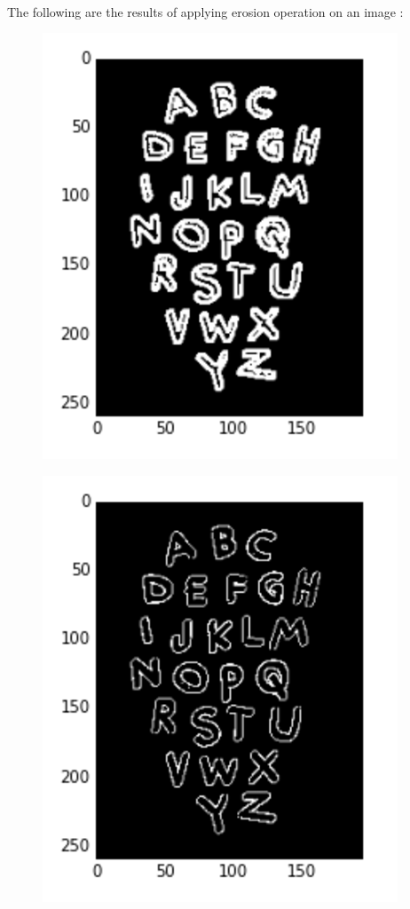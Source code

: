 \documentclass{article}
\begin{document}
		\paragraph{}
		The following are the results of applying erosion operation on an image :
		\begin{figure}[H]
			\begin{minipage}{.5\textwidth}
				\centering
				\includegraphics[width=0.6\linewidth]{images/before_erosion.png}
				\label{fig:test18}
			\end{minipage}
			\begin{minipage}{.5\textwidth}
				\centering
				\includegraphics[width=0.6\linewidth]{images/after_erosion.png}
				\label{fig:test19}
			\end{minipage}
		\end{figure}
\end{document}
